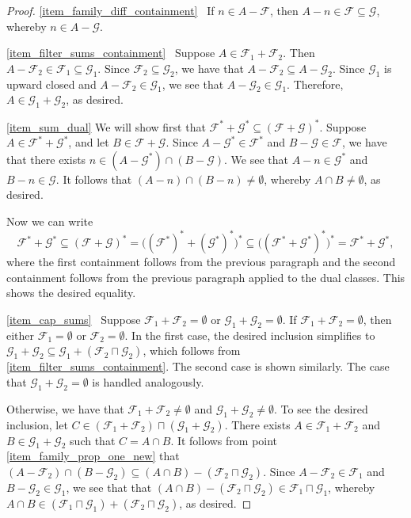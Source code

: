 \documentclass[letter,11pt]{article}
\theoremstyle{plain}
\theoremstyle{definition}
\theoremstyle{plain}
\theoremstyle{plain}
\numberwithin{equation}{section}
\newcommand{\filter}{\mathscr{F}}
\newcommand{\filtertwo}{\mathscr{G}}
\newcommand{\classcap}{\sqcap}
\newcommand{\family}{\mathscr{F}}
\newcommand{\familyone}{\mathscr{F}}
\newcommand{\familytwo}{\mathscr{G}}
\begin{document}
\begin{proof}
    \eqref{item_family_diff_containment} \ If $n \in A - \family$, then $A - n \in \family \subseteq \familytwo$, whereby $n \in A - \familytwo$.
    
    \eqref{item_filter_sums_containment} \ Suppose $A \in \filter_1 + \filter_2$.  Then $A-\filter_2 \in \filter_1 \subseteq \filtertwo_1$.  Since $\filter_2 \subseteq \filtertwo_2$, we have that $A - \filter_2 \subseteq A - \filtertwo_2$.  Since $\filtertwo_1$ is upward closed and $A- \filter_2 \in \filtertwo_1$, we see that $A - \filtertwo_2 \in \filtertwo_1$.  Therefore, $A \in \filtertwo_1 + \filtertwo_2$, as desired.
    
    \eqref{item_sum_dual} We will show first that $\familyone^* + \familytwo^* \subseteq (\familyone + \familytwo)^*$.  Suppose $A \in \familyone^* + \familytwo^*$, and let $B \in \familyone + \familytwo$.  Since $A - \familytwo^* \in \familyone^*$ and $B - \familytwo \in \familyone$, we have that there exists $n \in (A - \familytwo^*) \cap (B - \familytwo)$.  We see that $A - n \in \familytwo^*$ and $B - n \in \familytwo$.  It follows that $(A-n) \cap (B-n) \neq \emptyset$, whereby $A \cap B \neq \emptyset$, as desired.

    Now we can write
    \[\familyone^* + \familytwo^* \subseteq (\familyone + \familytwo)^* = \big((\familyone^*)^* + (\familytwo^*)^* \big)^* \subseteq \big((\familyone^* + \familytwo^*)^* \big)^* = \familyone^* + \familytwo^*,\]
    where the first containment follows from the previous paragraph and the second containment follows from the previous paragraph applied to the dual classes.  This shows the desired equality.

    \eqref{item_cap_sums} \ Suppose $\family_1 + \family_2 = \emptyset$ or $\familytwo_1 + \familytwo_2 = \emptyset$.  If $\family_1 + \family_2 = \emptyset$, then either $\family_1 = \emptyset$ or $\family_2 = \emptyset$.  In the first case, the desired inclusion simplifies to $\familytwo_1 + \familytwo_2 \subseteq \familytwo_1 + (\family_2 \classcap \familytwo_2)$, which follows from \eqref{item_filter_sums_containment}.  The second case is shown similarly.  The case that $\familytwo_1 + \familytwo_2 = \emptyset$ is handled analogously.

    Otherwise, we have that $\family_1 + \family_2 \neq \emptyset$ and $\familytwo_1 + \familytwo_2 \neq \emptyset$.  To see the desired inclusion, let $C \in (\familyone_1 + \familyone_2) \classcap (\familytwo_1 + \familytwo_2)$. There exists $A \in \familyone_1 + \familyone_2$ and $B \in \familytwo_1 + \familytwo_2$ such that $C = A \cap B$. It follows from point \eqref{item_family_prop_one_new} that $(A-\family_2) \cap (B-\familytwo_2) \subseteq (A \cap B) - (\family_2 \classcap \familytwo_2)$.  Since $A-\family_2 \in \family_1$ and $B-\familytwo_2 \in \familytwo_1$, we see that that $(A \cap B) - (\family_2 \classcap \familytwo_2) \in \family_1 \classcap \familytwo_1$, whereby $A \cap B \in (\family_1 \classcap \familytwo_1) + (\family_2 \classcap \familytwo_2)$, as desired.
\end{proof}
\end{document}
